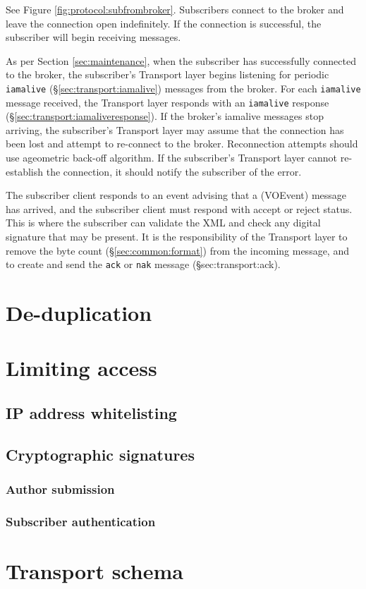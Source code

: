\documentclass[a4paper,11pt]{ivoa}
\begin{document}
See Figure \ref{fig:protocol:subfrombroker}. Subscribers connect to the broker
and leave the connection open indefinitely. If the connection is successful,
the subscriber will begin receiving messages.

As per Section \ref{sec:maintenance}, when the subscriber has successfully connected to the
broker, the subscriber's Transport layer begins listening for periodic
\texttt{iamalive} (\S\ref{sec:transport:iamalive}) messages from the broker.
For each \texttt{iamalive} message
received, the Transport layer responds with an \texttt{iamalive} response
(\S\ref{sec:transport:iamaliveresponse}).
If the broker's iamalive messages stop arriving, the subscriber's Transport
layer may assume that the connection has been lost and attempt to re-connect
to the broker. Reconnection attempts should use ageometric back-off algorithm.
If the subscriber's Transport layer cannot re-establish the connection, it
should notify the subscriber of the error.

The subscriber client responds to an event advising that a (VOEvent) message
has arrived, and the subscriber client must respond with accept or reject
status. This is where the subscriber can validate the XML and check any
digital signature that may be present. It is the responsibility of the
Transport layer to remove the byte count (\S\ref{sec:common:format}) from the
incoming message, and to create and send the \texttt{ack} or \texttt{nak}
message (\S{sec:transport:ack}).

\section{De-duplication}
\label{sec:dedup}

\section{Limiting access}
\label{sec:limit}

\subsection{IP address whitelisting}
\label{sec:limit:whitelist}

\subsection{Cryptographic signatures}
\label{sec:limit:crypto}

\subsubsection{Author submission}
\label{sec:limit:crypto:author}

\subsubsection{Subscriber authentication}
\label{sec:limit:crypto:subscriber}

\appendix

\section{Transport schema}
\label{sec:transportschema}



\end{document}
